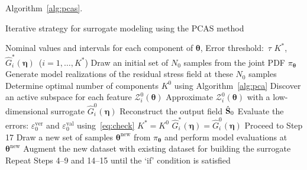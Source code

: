 Algorithm~\ref{alg:pcas}. 
%
\bigskip
\begin{breakablealgorithm}
\renewcommand{\algorithmicrequire}{\textbf{Input:}}
\renewcommand{\algorithmicensure}{\textbf{Output:}}
  \caption{Iterative strategy for surrogate modeling using the PCAS method}
  \begin{algorithmic}[1]
  \Require Nominal values and intervals for each component of $\bm{\theta}$, Error threshold:~$\tau$
  \Ensure $K^\ast$, $\hat{G}_i^\ast(\bm{\eta})$~($i=1,\ldots,K^\ast$)
    \State Draw an initial set of $N_0$ samples from the joint PDF $\pi_{\bm{\theta}}$
    \State Generate model realizations of the residual stress field at these $N_0$ samples
    \State Determine optimal number of components $K^0$ using Algorithm~\ref{alg:pca}
    \State Discover an active subspace for each feature $\mathcal{Z}_i^0(\bm{\theta})$
    \State Approximate $\mathcal{Z}_i^0(\bm{\theta})$ with a low-dimensional surrogate $\hat{G}_i^0(\bm{\eta})$ 
    \State Reconstruct the output field $\hat{\mathbf{{S}}}_0$
    \State Evaluate the errors: $\varepsilon_0^{\text{ver}}$ and $\varepsilon_0^{\text{val}}$ using~\eqref{eq:check}
    \State $K^\ast=K^0$
    \State $\hat{G}_i^\ast(\bm{\eta})=\hat{G}_i^0(\bm{\eta})$
    \State Proceed to Step 17
    \EndIf
    \State Draw a new set of samples $\bm{\theta}^{\text{new}}$ from $\pi_{\bm{\theta}}$ and 
    perform model evaluations at $\bm{\theta}^{\text{new}}$
    \State Augment the new dataset with existing dataset for building the surrogate
    \State Repeat Steps 4--9 and 14--15 until the `if' condition is satisfied
  \EndProcedure
  \end{algorithmic}
  \label{alg:pcas}
\end{breakablealgorithm} 
\bigskip

